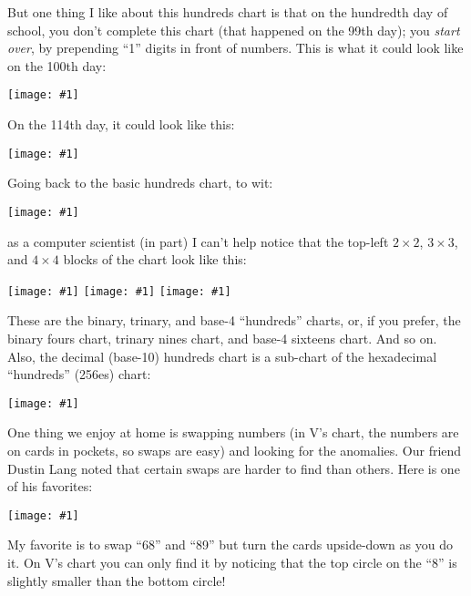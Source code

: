 \documentclass[12pt,pdftex]{article}
\newcommand{\showchart}[1]{\texttt{[image: \#1]}}
\begin{document}
But one thing I like about this hundreds chart is that on the
hundredth day of school, you don't complete this chart (that happened
on the 99th day); you \emph{start over}, by prepending ``1'' digits in
front of numbers.  This is what it could look like on the 100th day:
\begin{center}
\showchart{hundreds_chart_day100.pdf}
\end{center}
On the 114th day, it could look like this:
\begin{center}
\showchart{hundreds_chart_day114.pdf}
\end{center}

Going back to the basic hundreds chart, to wit:
\begin{center}
\showchart{hundreds_chart_default.pdf}
\end{center}
as a computer scientist (in part) I can't help notice that the
top-left $2\times 2$, $3\times 3$, and $4\times 4$ blocks of the
chart look like this:
\begin{center}
\showchart{hundreds_chart_2x2_base2.pdf}
\quad
\showchart{hundreds_chart_3x3_base3.pdf}
\quad
\showchart{hundreds_chart_4x4_base4.pdf}
\end{center}
These are the binary, trinary, and base-4 ``hundreds'' charts, or, if
you prefer, the binary fours chart, trinary nines chart, and base-4
sixteens chart.  And so on.  Also, the decimal (base-10) hundreds
chart is a sub-chart of the hexadecimal ``hundreds'' (256es) chart:
\begin{center}
\showchart{hundreds_chart_16x16_base16.pdf}
\end{center}

One thing we enjoy at home is swapping numbers (in V's chart, the
numbers are on cards in pockets, so swaps are easy) and looking for
the anomalies.  Our friend Dustin Lang noted that certain swaps are
harder to find than others.  Here is one of his favorites:
\begin{center}
\showchart{hundreds_chart_swap14.pdf}
\end{center}
My favorite is to swap ``68'' and ``89'' but turn the cards
upside-down as you do it.  On V's chart you can only find it by
noticing that the top circle on the ``8'' is slightly smaller than the
bottom circle!
\end{document}
